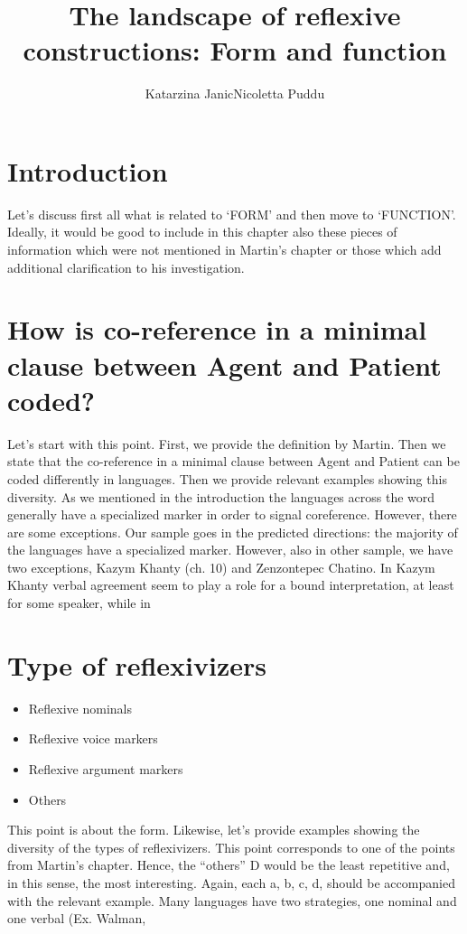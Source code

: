 \documentclass[output=paper]{langsci/langscibook}
\author{Katarzina Janic\lastand Nicoletta Puddu{}\orcid{}}
\title{The landscape of reflexive constructions: Form and function}
\begin{document}
\maketitle

\section{Introduction} 
Let’s discuss first all what is related to ‘FORM’ and then move to ‘FUNCTION’. Ideally, it would be good to include in this chapter also these pieces of information which were not mentioned in Martin’s chapter or those which add additional clarification to his investigation.


\section{How is co-reference in a minimal clause between Agent and Patient coded?}
Let’s start with this point. First, we provide the definition by Martin. Then we state that the co-reference in a minimal clause between Agent and Patient can be coded differently in languages. Then we provide relevant examples showing this diversity.
As we mentioned in the introduction the languages across the word generally have a specialized marker in order to signal coreference. However, there are some exceptions. Our sample goes in the predicted directions: the majority of the languages have a specialized marker. However, also in other sample, we have two exceptions, Kazym Khanty (ch. 10) and Zenzontepec Chatino.
In Kazym Khanty verbal agreement seem to play a role for a bound interpretation, at least for some speaker, while in 
\section{ Type of reflexivizers}

\begin{itemize}
\item Reflexive nominals
\item Reflexive voice markers
\item Reflexive argument markers
\item Others
\end{itemize}

This point is about the form. Likewise, let’s provide examples showing the diversity of the types of reflexivizers. This point corresponds to one of the points from Martin’s chapter. Hence, the “others” D would be the least repetitive and, in this sense, the most interesting. Again, each a, b, c, d, should be accompanied with the relevant example.
Many languages have two strategies, one nominal and one verbal (Ex. Walman, 
\end{document}
